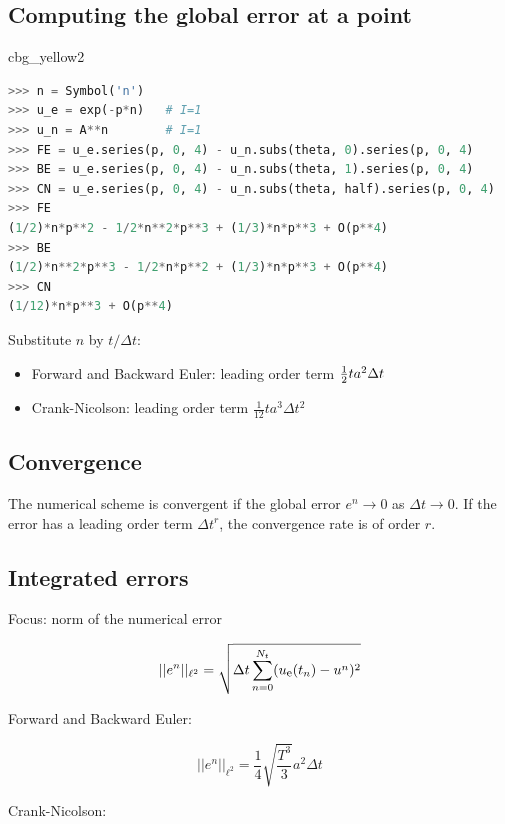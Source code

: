 \documentclass[%
oneside,                 %
final,                   %
10pt]{article}
\newenvironment{_cod_tight}[1]{
   \def\FrameCommand{\colorbox{#1}}
   \FrameRule0.6pt\MakeFramed {\FrameRestore}\vskip3mm}
   {\vskip0mm\endMakeFramed}
\newenvironment{cod}[1]{
\bgroup\rmfamily
\fboxsep=0mm\relax
\begin{_cod_tight}{#1}
\list{}{\parsep=-2mm\parskip=0mm\topsep=0pt\leftmargin=2mm
\rightmargin=2\leftmargin\leftmargin=4pt\relax}
\item\relax}
{\endlist\end{_cod_tight}\egroup}
\begin{document}
\noindent
\subsection*{Computing the global error at a point}

\begin{cod}{cbg_yellow2}\begin{lstlisting}[language=Python,style=simple,xleftmargin=2mm]
>>> n = Symbol('n')
>>> u_e = exp(-p*n)   # I=1
>>> u_n = A**n        # I=1
>>> FE = u_e.series(p, 0, 4) - u_n.subs(theta, 0).series(p, 0, 4)
>>> BE = u_e.series(p, 0, 4) - u_n.subs(theta, 1).series(p, 0, 4)
>>> CN = u_e.series(p, 0, 4) - u_n.subs(theta, half).series(p, 0, 4)
>>> FE
(1/2)*n*p**2 - 1/2*n**2*p**3 + (1/3)*n*p**3 + O(p**4)
>>> BE
(1/2)*n**2*p**3 - 1/2*n*p**2 + (1/3)*n*p**3 + O(p**4)
>>> CN
(1/12)*n*p**3 + O(p**4)
\end{lstlisting}\end{cod}
\noindent
Substitute $n$ by $t/\Delta t$:

\begin{itemize}
 \item Forward and Backward Euler: leading order term $\half ta^2\Delta t$

 \item Crank-Nicolson: leading order term $\frac{1}{12}ta^3\Delta t^2$
\end{itemize}

\noindent
\subsection*{Convergence}

The numerical scheme is convergent if the global error
$e^n\rightarrow 0$ as $\Delta t\rightarrow 0$.
If the error has a leading order term $\Delta t^r$, the
convergence rate is of order $r$.

\subsection*{Integrated errors}

Focus: norm of the numerical error

\[ ||e^n||_{\ell^2} = \sqrt{\Delta t\sum_{n=0}^{N_t} ({\uex}(t_n) - u^n)^2}\]

Forward and Backward Euler:

\[ ||e^n||_{\ell^2} = \frac{1}{4}\sqrt{\frac{T^3}{3}} a^2\Delta t\]

Crank-Nicolson:
\end{document}
